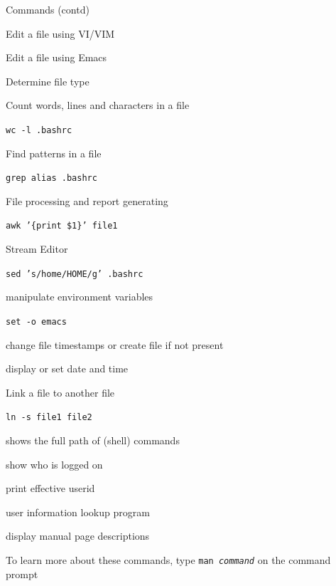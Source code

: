 \documentclass[slidestop,mathserif,compress,xcolor=svgnames]{beamer}
\newcommand*\vardiamond{\textcolor{tigerspurple}{%
  \ensuremath{\blacklozenge}}}
\begin{document}
\begin{frame}[allowframebreaks]{\small Commands (contd)}
  \begin{itemize}
    \item[vi:] Edit a file using VI/VIM
    \item[emacs:] Edit a file using Emacs
    \item[file:] Determine file type
    \item[wc:] Count words, lines and characters in a file
    {\tiny\item[$\vardiamond$] \texttt{wc -l .bashrc}}
    \item[grep:] Find patterns in a file
    {\tiny\item[$\vardiamond$] \texttt{grep alias .bashrc}}
    \item[awk:] File processing and report generating
    {\tiny\item[$\vardiamond$] \texttt{awk '\{print \$1\}' file1}}
    \item[sed:] Stream Editor
    {\tiny\item[$\vardiamond$] \texttt{sed 's/home/HOME/g' .bashrc}}
    \item[set:] manipulate environment variables
    {\tiny\item[$\vardiamond$] \texttt{set -o emacs}}
    \item[touch:] change file timestamps or create file if not present
    \item[date:] display or set date and time
    \item[ln:] Link a file to another file
    {\tiny\item[$\vardiamond$] \texttt{ln -s file1 file2}}
    \item[which:] shows the full path of (shell) commands
    \item[who:] show who is logged on
    \item[whoami:] print effective userid
    \item[finger:] user information lookup program
    \item[whatis:] display manual page descriptions
  \end{itemize}
  To learn more about these commands, type \texttt{man \textit{command}} on the command prompt
\end{frame}
\end{document}
